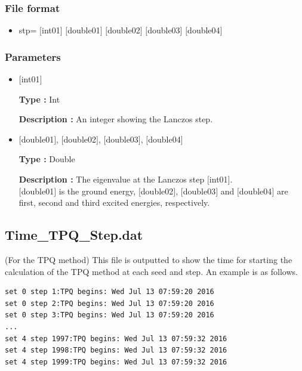 \subsubsection{File format}
 \begin{itemize}
   \item stp= $[$int01$]$ $[$double01$]$ $[$double02$]$ $[$double03$]$ $[$double04$]$
  \end{itemize}
\subsubsection{Parameters}
 \begin{itemize}

  \item  $[$int01$]$
  
 {\bf Type :} Int

{\bf Description :} An integer showing the Lanczos step.
 
  \item  $[$double01$]$, $[$double02$]$, $[$double03$]$, $[$double04$]$

 {\bf Type :} Double 

{\bf Description :} The eigenvalue at the Lanczos step $[$int01$]$.\\
$[$double01$]$ is the ground energy, $[$double02$]$, $[$double03$]$ and $[$double04$]$ are first, second and third excited energies, respectively.

 \end{itemize}

\newpage
\subsection{Time\_TPQ\_Step.dat}
(For the TPQ method) This file is outputted to show the time for starting the calculation of the TPQ method at each seed and step. An example is as follows.\\
\begin{minipage}{15cm}
\begin{screen}
\begin{verbatim}
set 0 step 1:TPQ begins: Wed Jul 13 07:59:20 2016
set 0 step 2:TPQ begins: Wed Jul 13 07:59:20 2016
set 0 step 3:TPQ begins: Wed Jul 13 07:59:20 2016
...
set 4 step 1997:TPQ begins: Wed Jul 13 07:59:32 2016
set 4 step 1998:TPQ begins: Wed Jul 13 07:59:32 2016
set 4 step 1999:TPQ begins: Wed Jul 13 07:59:32 2016
\end{verbatim}
\end{screen}
\end{minipage}

